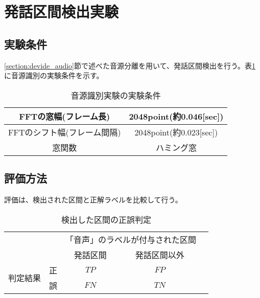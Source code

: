 \section{発話区間検出実験}

\subsection{実験条件}
\ref{section:devide_audio}節で述べた音源分離を用いて、発話区間検出を行う。表\ref{table:detail_identification_method}に音源識別の実験条件を示す。

\begin{table}[H]
  \begin{center}
    \caption{音源識別実験の実験条件 \label{table:detail_identification_method}}
    \begin{tabular}{|c||c|} \hline
      FFTの窓幅(フレーム長) & 2048point(約0.046[sec])   \\ \hline
      FFTのシフト幅(フレーム間隔) &  2048point(約0.023[sec]) \\ \hline
      窓関数 & ハミング窓  \\ \hline
    \end{tabular}
  \end{center}
\end{table}

\subsection{評価方法}
評価は、検出された区間と正解ラベルを比較して行う。

\begin{table}[H]
\begin{center}
    \caption{検出した区間の正誤判定 \label{table:search_table}}
\begin{tabular}{|c|c|c|c|l}
\cline{1-4}
\multicolumn{2}{|c|}{\multirow{2}{*}{}} & \multicolumn{2}{c|}{「音声」のラベルが付与された区間} &  \\ \cline{3-4}
\multicolumn{2}{|c|}{}                  & 発話区間        & 発話区間以外        &  \\ \cline{1-4}
\multirow{2}{*}{判定結果}        & 正        & $TP$                  & $FP$                   &  \\ \cline{2-4}
& 誤        & $FN$                  & $TN$                   &  \\ \cline{1-4}
\end{tabular}
\end{center}
\end{table}

